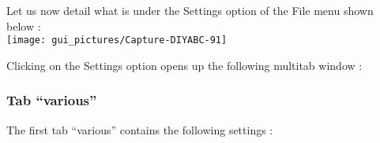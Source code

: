 Let us now detail what is under the \textsf{Settings} option of the
\textsf{File} menu shown below :\\


\texttt{[image: gui\_pictures/Capture-DIYABC-91]} \\


\newpage{}

Clicking on the \textsf{Settings} option opens up the following multitab
window :\\



\subsubsection{Tab \textsf{``various''}}

The first tab \textsf{``various''} contains the following settings
:
